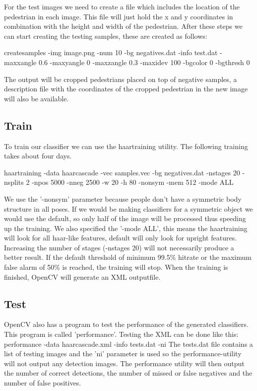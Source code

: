 \documentclass{article}
\begin{document}
For the test images we need to create a file which includes the location of the pedestrian in each image. This file will just hold the x and y coordinates in combination with the height and width of the pedestrian.
After these steps we can start creating the testing samples, these are created as follows:

createsamples -img image.png -num 10 -bg negatives.dat -info test.dat -maxxangle 0.6 -maxyangle 0 -maxzangle 0.3 -maxidev 100 -bgcolor 0 -bgthresh 0

The output will be cropped pedestrians placed on top of negative samples, a description file with the coordinates of the cropped pedestrian in the new image will also be available.




\subsection{Train}
To train our classifier we can use the haartraining utility. The following training takes about four days.

haartraining -data haarcascade -vec samples.vec -bg negatives.dat -nstages 20 -nsplits 2 -npos 5000 -nneg 2500 -w 20 -h 80 -nonsym -mem 512 -mode ALL

We use the '-nonsym' parameter because people don't have a symmetric body structure in all poses. If we would be making classifiers for a symmetric object we would use the default, so only half of the image will be processed  thus speeding up the training. We also specified the '-mode ALL', this means the haartraining will look for all haar-like features, default will only look for upright features.
Increasing the number of stages (-nstages 20) will not necessarily produce a better result. If the default threshold of minimum 99.5\% hitrate or the maximum false alarm of 50\% is reached, the training will stop.
When the training is finished, OpenCV will generate an XML outputfile.
\subsection{Test}
OpenCV also has a program to test the performance of the generated classifiers. This program is called 'performance'. Testing the XML can be done like this:
performance -data haarcascade.xml -info tests.dat -ni
The tests.dat file contains a list of testing images and the 'ni' parameter is used so the performance-utility will not output any detection images.
The performance utility will then output the number of correct detections, the number of missed or false negatives and the number of false positives.
\end{document}
